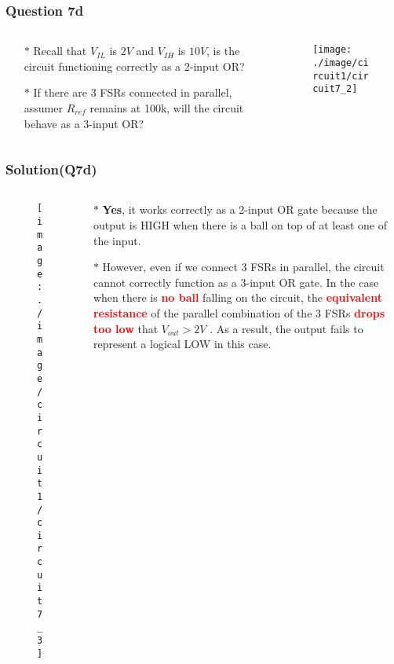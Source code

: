 \documentclass{beamer}
\newcommand{\red}[1]{\textcolor{red}{#1}}
\begin{document}
\begin{frame}
\frametitle{Question 7d}

\begin{columns}
\begin{column}{8.5cm}
\begin{itemize} \itemsep1pt \parskip0pt 
  \item[$\ast$] Recall that $V_{IL}$ is $2V$ and $V_{IH}$ is $10V$, is the circuit functioning correctly as a 2-input OR?
  \vspace{8mm}
  \item[$\ast$] If there are 3 FSRs connected in parallel, assumer $R_{ref}$ remains at 100k, will the circuit behave as a 3-input OR?
\end{itemize}
\end{column}


\begin{column}{4cm}
\begin{figure}[H]
  \centering
  \texttt{[image: ./image/circuit1/circuit7\_2]}
\end{figure}
\end{column}



\end{columns}

\end{frame}


\begin{frame}
\frametitle{Solution(Q7d)}

\begin{columns}
\begin{column}{3cm}
\begin{figure}[H]
  \centering
  \texttt{[image: ./image/circuit1/circuit7\_3]}
\end{figure}
\end{column}

\begin{column}{8cm}
\begin{itemize} \itemsep1pt \parskip0pt 
  \item[$\ast$] {\bf Yes}, it works correctly as a 2-input OR gate because the output is HIGH when there is a ball on top of at least one of the input.
  \item[$\ast$] However, even if we connect 3 FSRs in parallel, the circuit cannot correctly function as a 3-input OR gate. In the case when there is \red{{\bf no ball}} falling on the circuit, the \red{{\bf equivalent resistance}} of the parallel combination of the 3 FSRs \red{{\bf drops too low}} that $V_{out} > 2V$ . As a result, the output fails to represent a logical LOW in this case.
\end{itemize}
\end{column}



\end{columns}

\end{frame}
\end{document}
